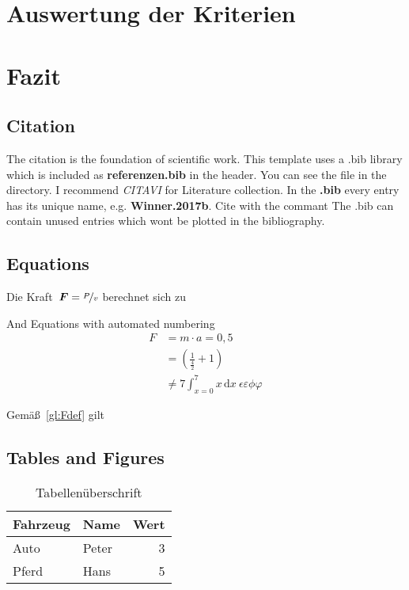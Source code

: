 \documentclass[12pt,
titlepage,
a4paper,
oneside,     %
openany,     %
listof=totoc,  %
numbers = noenddot, %
bibliography=totoc,    %
headsepline, %
]{scrbook} %
\newcommand{\ve}[1]{\ensuremath \boldsymbol{#1}\xspace}
\begin{document}
\chapter{Auswertung der Kriterien}
\label{cha:auswertung}



\chapter{Fazit}
\label{cha:fazit}



\section{Citation}
\label{sec_citation}

The citation is the foundation of scientific work. This template uses a .bib library which is included as \textbf{referenzen.bib} in the header. You can see the file in the directory. I recommend \textit{CITAVI} for Literature collection.
In the \textbf{.bib} every entry has its unique name, e.g. \textbf{Winner.2017b}. Cite with the commant \cite{Winner.2017b}
The .bib can contain unused entries which wont be plotted in the bibliography.

\section{Equations}
\label{sec_Equations}

Die Kraft~$\ve{F} = \nicefrac{P}{v}$ berechnet sich zu

And Equations with automated numbering
\begin{align}
	F &= m \cdot a = 0,5 \nonumber\\
	&= \left( \frac{1}{\frac{4}{2}} + 1 \right)	\label{gl:Fdef}\\
	&\neq 7 \int_{x=0}^{7} x \, \mathrm{d}x ~ \epsilon \varepsilon \phi \varphi
\end{align}

Gemäß~\ref{gl:Fdef} gilt

\section{Tables and Figures}
\label{sec:tables}

\begin{table}
	\caption{Tabellenüberschrift}
	\label{tab_ExampleTable}
	\centering
	\begin{tabular}{l l r}
		Fahrzeug & Name & Wert \\
		\toprule
		Auto & Peter & 3  \\ 
		Pferd & Hans & 5  \\
	\end{tabular}
\end{table}
\end{document}
